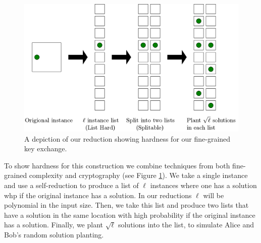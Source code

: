 \begin{figure}[h]
	\centering
	\includegraphics[scale=0.6]{fgcrypto/FullReduction.png}
	\caption{A depiction of our reduction showing hardness for our fine-grained key exchange.}
	\label{fig:wholeReductionBoxes}
\end{figure}

To show hardness for this construction we combine techniques from both fine-grained complexity and cryptography (see Figure \ref{fig:wholeReductionBoxes}). We take a single instance and use a self-reduction to produce a list of $\ell$ instances where one has a solution whp if the original instance has a solution. In our reductions $\ell$ will be polynomial in the input size. Then, we take this list and produce two lists that have a solution in the same location with high probability if the original instance has a solution. Finally, we plant $\sqrt{\ell}$ solutions into the list, to simulate Alice and Bob's random solution planting. 






